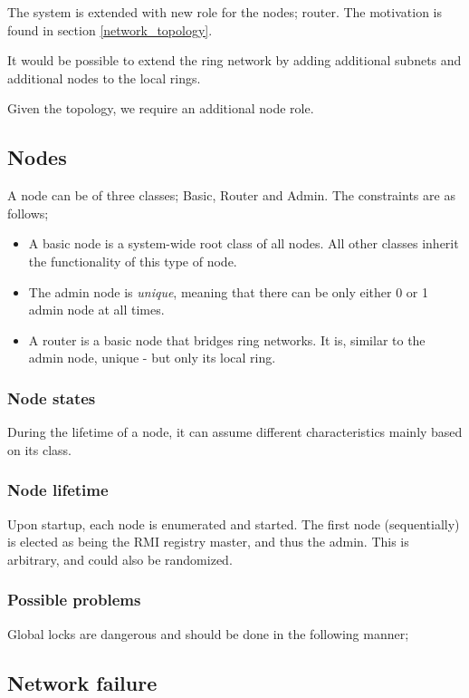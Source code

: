 \documentclass[10pt,a4paper]{article}
\begin{document}
The system is extended with new role for the nodes; router. The motivation is found in section \ref{network_topology}.

It would be possible to extend the ring network by adding additional subnets and additional nodes to the local rings.

Given the topology, we require an additional node role.

\subsection{Nodes}
A node can be of three classes; Basic, Router and Admin. The constraints are as follows;
\begin{itemize}
\item A basic node is a system-wide root class of all nodes. All other classes inherit the functionality of this type of node.
\item The admin node is \emph{unique}, meaning that there can be only either 0 or 1 admin node at all times.
\item A router is a basic node that bridges ring networks. It is, similar to the admin node, unique - but only its local ring.
\end{itemize}


\subsubsection{Node states}
During the lifetime of a node, it can assume different characteristics mainly based on its class.

\subsubsection{Node lifetime}
Upon startup, each node is enumerated and started. The first node (sequentially) is elected as being the RMI registry master, and thus the admin. This is arbitrary, and could also be randomized.

\subsubsection{Possible problems}
Global locks are dangerous and should be done in the following manner; 

\subsection{Network failure}
\end{document}
